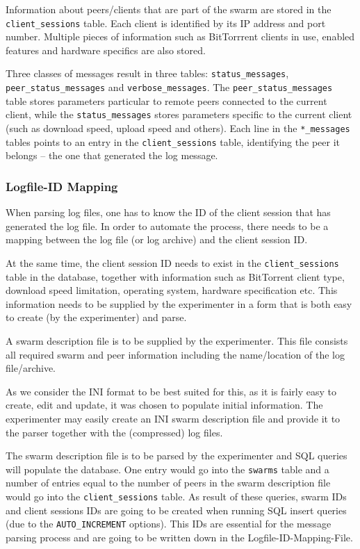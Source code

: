 Information about peers/clients that are part of the swarm are stored in the
\texttt{client\_sessions} table. Each client is identified by its IP address
and port number. Multiple pieces of information such as BitTorrrent clients in
use, enabled features and hardware specifics are also stored.

Three classes of messages result in three tables:
\texttt{status\_messages}, \texttt{peer\_status\_messages} and
\texttt{verbose\_messages}. The \texttt{peer\_status\_messages} table stores
parameters particular to remote peers connected to the current client, while
the \texttt{status\_messages} stores parameters specific to the current client
(such as download speed, upload speed and others). Each line in the
\texttt{*\_messages} tables points to an entry in the
\texttt{client\_sessions} table, identifying the peer it belongs -- the one
that generated the log message.

\subsubsection{Logfile-ID Mapping}

When parsing log files, one has to know the ID of the client session that has
generated the log file. In order to automate the process, there needs to be a
mapping between the log file (or log archive) and the client session ID.

At the same time, the client session ID needs to exist in the
\texttt{client\_sessions} table in the database, together with information
such as BitTorrent client type, download speed limitation, operating system,
hardware specification etc. This information needs to be supplied by the
experimenter in a form that is both easy to create (by the experimenter) and
parse.

A swarm description file is to be supplied by the experimenter. This file
consists all required swarm and peer information including the name/location
of the log file/archive.

As we consider the INI format to be best suited for this, as it is fairly easy
to create, edit and update, it was chosen to populate initial information. The
experimenter may easily create an INI swarm description file and provide it to
the parser together with the (compressed) log files.

The swarm description file is to be parsed by the experimenter and SQL queries
will populate the database. One entry would go into the \texttt{swarms} table
and a number of entries equal to the number of peers in the swarm description
file would go into the \texttt{client\_sessions} table. As result of these
queries, swarm IDs and client sessions IDs are going to be created when
running SQL insert queries (due to the \texttt{AUTO\_INCREMENT} options). This
IDs are essential for the message parsing process and are going to be written
down in the Logfile-ID-Mapping-File.

